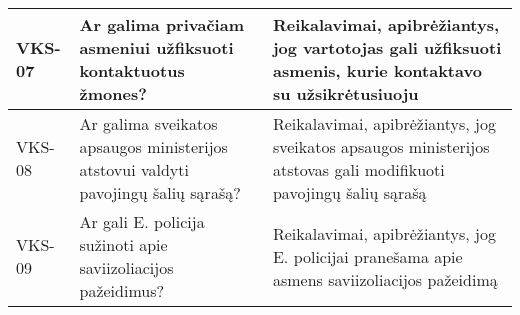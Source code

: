 \documentclass{VUMIFPSkursinis}
\begin{document}
\begin{center}
\begin{longtable}{|C{2cm}|L{5cm}|L{8cm}|}
 					VKS-07 &
 					Ar galima privačiam asmeniui užfiksuoti kontaktuotus žmones?& 
 					Reikalavimai, apibrėžiantys, jog vartotojas gali užfiksuoti asmenis, kurie kontaktavo su užsikrėtusiuoju\\ \hline  
 					VKS-08 &
 					Ar galima sveikatos apsaugos ministerijos atstovui valdyti pavojingų šalių sąrašą?& 
 					Reikalavimai, apibrėžiantys, jog sveikatos apsaugos ministerijos atstovas gali modifikuoti pavojingų šalių sąrašą\\ \hline  
 					VKS-09 &
 					Ar gali E. policija sužinoti apie saviizoliacijos pažeidimus?& 
 					Reikalavimai, apibrėžiantys, jog E. policijai pranešama apie asmens saviizoliacijos pažeidimą\\ \hline			
				\end{longtable}
			\end{center}			
\end{document}
